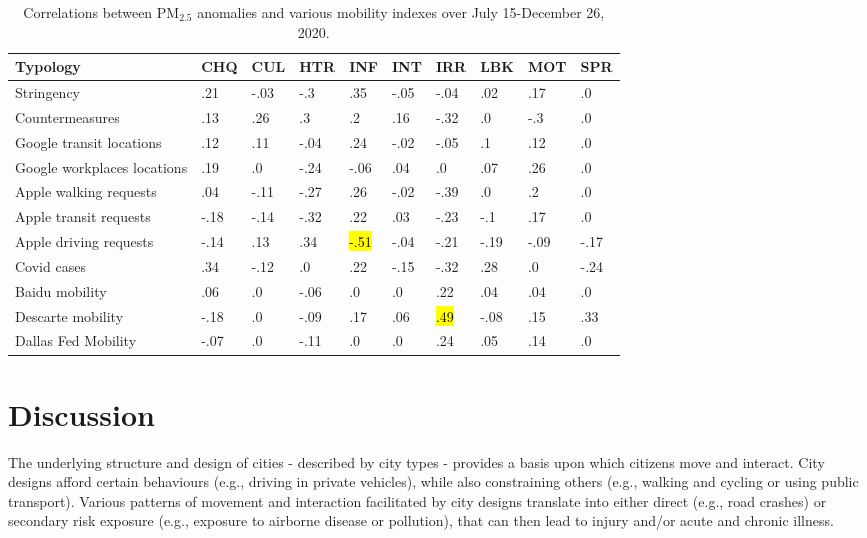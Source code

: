 \documentclass[preprint,12pt]{elsarticle}
\newcommand{\hlo}[2][orange]{{
  \colorlet{foo}{#1}
  \sethlcolor{foo}\hl{#2}}
}
\newcommand{\hlgr}[2][lightgray]{{
  \colorlet{foo}{#1}
  \sethlcolor{foo}\hl{#2}}
}
\begin{document}
\begin{table}[!ht]
\caption{\label{tab:pm25corr3} Correlations between PM$_{2.5}$ anomalies and various mobility indexes over July 15-December 26, 2020.}
    \centering
    \begin{tabular}{|l|p{0.75cm}|p{0.75cm}|p{0.75cm}|p{0.75cm}|p{0.75cm}|p{0.75cm}|p{0.75cm}|p{0.75cm}|p{0.75cm}|}
        \hline
    Typology & CHQ & CUL & HTR & INF & INT & IRR & LBK & MOT & SPR \\ \hline
    Stringency & .21 & -.03 & -.3 & .35 & -.05 & -.04 & .02 & .17 & .0 \\ \hline
     Countermeasures & .13 & .26 & .3 & .2 & .16 & -.32 & .0 & -.3 & .0 \\ \hline
    Google transit locations & .12 & .11 & -.04 & .24 & -.02 & -.05 & .1 & .12 & .0 \\ \hline
    Google workplaces locations & .19 & .0 & -.24 & -.06 & .04 & .0 & .07 & .26 & .0 \\ \hline
    Apple walking requests & .04 & -.11 & -.27 & .26 & -.02 & -.39 & .0 & .2 & .0 \\ \hline
    Apple transit requests & -.18 & -.14 & -.32 & .22 & .03 & -.23 & -.1 & .17 & .0 \\ \hline
    Apple driving requests & -.14 & .13 & .34 & \hlo{-.51} & -.04 & -.21 & -.19 & -.09 & -.17 \\ \hline
    Covid cases & .34 & -.12 & .0 & .22 & -.15 & -.32 & .28 & .0 & -.24 \\ \hline
    Baidu mobility & .06 & .0 & -.06 & .0 & .0 & .22 & .04 & .04 & .0 \\ \hline
    Descarte mobility & -.18 & .0 & -.09 & .17 & .06 & \hlgr{.49} & -.08 & .15 & .33 \\ \hline
    Dallas Fed Mobility & -.07 & .0 & -.11 & .0 & .0 & .24 & .05 & .14 & .0 \\ \hline      
        \end{tabular}
    \end{table}




\section*{Discussion}
The underlying structure and design of cities - described by city types - provides a basis upon which citizens move and interact. City designs afford certain behaviours (e.g., driving in private vehicles), while also constraining others (e.g., walking and cycling or using public transport). Various patterns of movement and interaction facilitated by city designs translate into either direct (e.g., road crashes) or secondary risk exposure (e.g., exposure to airborne disease or pollution), that can then lead to injury and/or acute and chronic illness.
\end{document}
